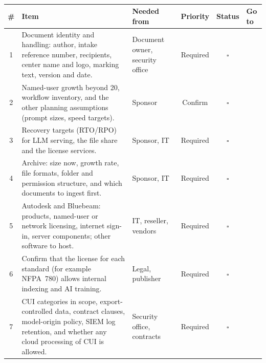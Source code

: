 
\\[4pt]

{\footnotesize
\begin{xltabular}{\textwidth}{@{}c Y{1.5} Y{0.7} c c Y{0.8}@{}}
  \toprule
  \# & Item & Needed from & Priority & Status & Go to \\
  \midrule
   & Document identity and handling: author, intake reference number, recipients, center name and logo, marking text, version and date. & Document owner, security office & Required & $\square$ &  \\
  2 & Named-user growth beyond 20, workflow inventory, and the other planning assumptions (prompt sizes, speed targets). & Sponsor & Confirm & $\square$ &  \\
  3 & Recovery targets (RTO/RPO) for LLM serving, the file share and the license services. & Sponsor, IT & Required & $\square$ &  \\
  4 & Archive: size now, growth rate, file formats, folder and permission structure, and which documents to ingest first. & Sponsor, IT & Required & $\square$ &  \\
  5 & Autodesk and Bluebeam: products, named-user or network licensing, internet sign-in, server components; other software to host. & IT, reseller, vendors & Required & $\square$ &  \\
  6 & Confirm that the license for each standard (for example NFPA~780) allows internal indexing and AI training. & Legal, publisher & Required & $\square$ &  \\
  7 & CUI categories in scope, export-controlled data, contract clauses, model-origin policy, SIEM log retention, and whether any cloud processing of CUI is allowed. & Security office, contracts & Required & $\square$ &  \\

\end{xltabular}}
